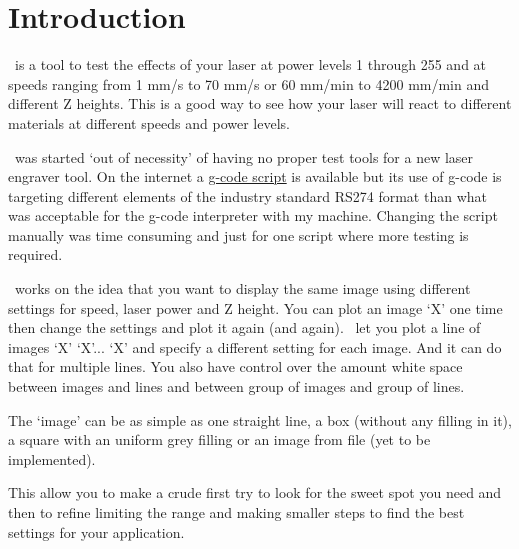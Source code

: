 \chapter{Introduction}\label{Introduction}

\GS\ is a tool to test the effects of your laser at power levels 1 through 255 and
at speeds ranging from 1 mm/s to 70 mm/s or 60 mm/min to 4200 mm/min and different
Z heights. This is a good way to see how your laser will react to different materials
at different speeds and power levels.

\GS\ was started `out of necessity' of having no proper test tools for a new laser
engraver tool. On the internet a \href{https://www.thingiverse.com/thing:3349071}{g-code script}
is available but its use of g-code is targeting different elements of the industry
standard RS274 format than what was acceptable for the g-code interpreter with my machine.
Changing the script manually was time consuming and just for one script where more testing
is required.

\GS\ works on the idea that you want to display the same image using different settings
for speed, laser power and Z height. You can plot an image `X' one time then change the settings
and plot it again (and again). \GS\ let you plot a line of images `X' `X'... `X' and specify
a different setting for each image. And it can do that for multiple lines. You also have
control over the amount white space between images and lines and between group of
images and group of lines.

The `image' can be as simple as one straight line, a box (without any filling in it), a square
with an uniform grey filling or an image from file (yet to be implemented).

This allow you to make a crude first try to look for the sweet spot you need and then
to refine limiting the range and making smaller steps to find the best settings for your
application.
